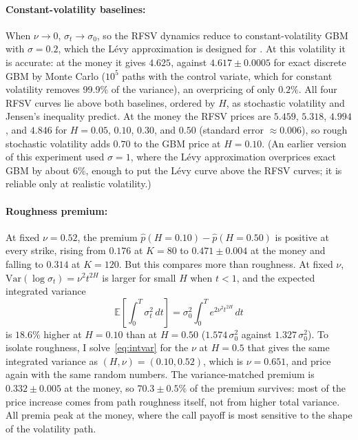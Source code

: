 \paragraph{Constant-volatility baselines: }
When $\nu \to 0$, $\sigma_t \to \sigma_0$, so the RFSV dynamics reduce to
constant-volatility GBM with $\sigma = 0.2$, which the Lévy approximation is designed
for \citep{levy1992pricing}.  At this volatility it is accurate: at the money it gives
$4.625$, against $4.617 \pm 0.0005$ for exact discrete GBM by Monte Carlo
($10^5$ paths with the control variate, which for constant volatility removes 99.9\%
of the variance), an overpricing of only $0.2\%$.  All four RFSV curves lie above both
baselines, ordered by $H$, as stochastic volatility and Jensen's inequality predict.
At the money the RFSV prices are $5.459$, $5.318$, $4.994$, and $4.846$ for
$H = 0.05$, $0.10$, $0.30$, and $0.50$ (standard error $\approx 0.006$), so rough
stochastic volatility adds $0.70$ to the GBM price at $H = 0.10$.  (An earlier
version of this experiment used $\sigma = 1$, where the Lévy approximation overprices
exact GBM by about 6\%, enough to put the Lévy curve above the RFSV curves; it is
reliable only at realistic volatility.)

\paragraph{Roughness premium: }
At fixed $\nu = 0.52$, the premium $\hat{p}(H{=}0.10) - \hat{p}(H{=}0.50)$ is positive at
every strike, rising from $0.176$ at $K = 80$ to $0.471 \pm 0.004$ at the money and
falling to $0.314$ at $K = 120$.  But this compares more than roughness.  At fixed
$\nu$, $\text{Var}(\log\sigma_t) = \nu^2 t^{2H}$ is larger for small $H$ when $t < 1$, and
the expected integrated variance
\begin{equation}
  \label{eq:intvar}
  \mathbb{E}\!\left[\int_0^T \sigma_t^2\,dt\right]
  = \sigma_0^2 \int_0^T e^{2\nu^2 t^{2H}}\,dt
\end{equation}
is $18.6\%$ higher at $H = 0.10$ than at $H = 0.50$ ($1.574\,\sigma_0^2$ against
$1.327\,\sigma_0^2$).  To isolate roughness, I solve~\eqref{eq:intvar} for the $\nu$ at
$H = 0.5$ that gives the same integrated variance as $(H, \nu) = (0.10, 0.52)$, which
is $\nu = 0.651$, and price again with the same random numbers.  The variance-matched
premium is $0.332 \pm 0.005$ at the money, so $70.3 \pm 0.5\%$ of the premium
survives: most of the price increase comes from path roughness itself, not from
higher total variance.  All premia peak at the money, where the call payoff is most
sensitive to the shape of the volatility path.

